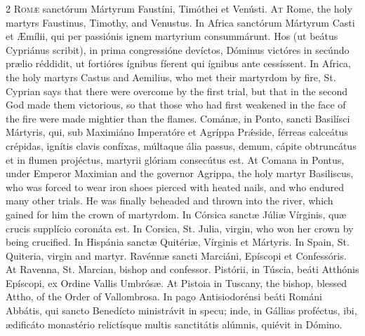 \begin{paracol}{2}
\lettrine[lines=2]{R}{omæ} sanctórum 
 Mártyrum Faustíni, Timóthei et Venústi.
\switchcolumn
{}
\lettrine[lines=2]{A}{t} Rome, the holy martyrs Faustinus, 
 Timothy, and Venustus.
\switchcolumn*
{}
In Africa sanctórum 
 Mártyrum Casti et Æmílii, qui per passiónis ignem martyrium consummárunt. 
 Hos (ut beátus Cypriánus scribit), in prima congressióne devíctos, Dóminus 
 victóres in secúndo prælio réddidit, ut fortióres ígnibus fíerent qui 
 ígnibus ante cessíssent.
\switchcolumn
{}
In Africa, the holy martyrs Castus 
 and Aemilius, who met their martyrdom by fire, St. Cyprian says that there 
 were overcome by the first trial, but that in the second God made them 
 victorious, so that those who had first weakened in the face of the fire 
 were made mightier than the flames.
\switchcolumn*
{}
Cománæ, in Ponto, 
 sancti Basilísci Mártyris, qui, sub Maximiáno Imperatóre et Agríppa Prǽside, 
 férreas calceátus crépidas, ignítis clavis confíxas, múltaque ália passus, 
 demum, cápite obtruncátus et in flumen projéctus, martyrii glóriam 
 consecútus est.
\switchcolumn
{}
At Comana in Pontus, under Emperor 
 Maximian and the governor Agrippa, the holy martyr Basiliscus, who was 
 forced to wear iron shoes pierced with heated nails, and who endured many 
 other trials. He was finally beheaded and thrown into the river, which 
 gained for him the crown of martyrdom.
\switchcolumn*
{}
In Córsica sanctæ 
 Júliæ Vírginis, quæ crucis supplício coronáta est.
\switchcolumn
{}
In Corsica, St. Julia, virgin, who 
 won her crown by being crucified.
\switchcolumn*
{}
In Hispánia sanctæ 
 Quitériæ, Vírginis et Mártyris.
\switchcolumn
{}
In Spain, St. Quiteria, virgin and 
 martyr.
\switchcolumn*
{}
Ravénnæ sancti 
 Marciáni, Epíscopi et Confessóris.
\switchcolumn
{}
At Ravenna, St. Marcian, bishop and 
 confessor.
\switchcolumn*
{}
Pistórii, in Túscia, 
 beáti Atthónis Epíscopi, ex Ordine Vallis Umbrósæ.
\switchcolumn
{}
At Pistoia in Tuscany, the bishop, 
 blessed Attho, of the Order of Vallombrosa.
\switchcolumn*
{}
In pago Antisiodorénsi 
 beáti Románi Abbátis, qui sancto Benedícto ministrávit in specu; inde, in 
 Gállias proféctus, ibi, ædificáto monastério relictísque multis sanctitátis 
 alúmnis, quiévit in Dómino.

\end{paracol}
